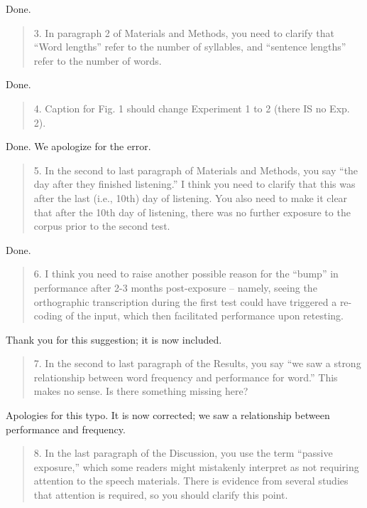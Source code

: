 \documentclass[12pt]{letter}
\begin{document}
Done. 

\begin{quote}
3. In paragraph 2 of Materials and Methods, you need to clarify that ``Word lengths'' refer to the number of syllables, and ``sentence lengths'' refer to the number of words.
\end{quote}

Done.

\begin{quote}
4. Caption for Fig. 1 should change Experiment 1 to 2 (there IS no Exp. 2).
\end{quote}

Done. We apologize for the error.

\begin{quote}
5. In the second to last paragraph of Materials and Methods, you say ``the day after they finished listening.'' I think you need to clarify that this was after the last (i.e., 10th) day of listening. You also need to make it clear that after the 10th day of listening, there was no further exposure to the corpus prior to the second test.
\end{quote}

Done.

\begin{quote}
6. I think you need to raise another possible reason for the ``bump'' in performance after 2-3 months post-exposure -- namely, seeing the orthographic transcription during the first test could have triggered a re-coding of the input, which then facilitated performance upon retesting.
\end{quote}

Thank you for this suggestion; it is now included.

\begin{quote}
7. In the second to last paragraph of the Results, you say ``we saw a strong relationship between word frequency and performance for word.'' This makes no sense. Is there something missing here?
\end{quote}

Apologies for this typo. It is now corrected; we saw a relationship between performance and frequency.

\begin{quote}
8. In the last paragraph of the Discussion, you use the term ``passive exposure,'' which some readers might mistakenly interpret as not requiring attention to the speech materials. There is evidence from several studies that attention is required, so you should clarify this point.
\end{quote}
\end{document}
